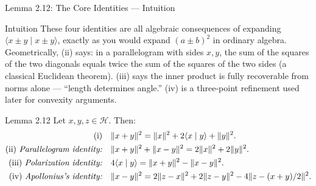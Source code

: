\documentclass[aspectratio=169,10pt]{beamer}
\newcommand{\Hil}{\mathcal{H}}
\newcommand{\ip}[2]{\langle #1 \mid #2 \rangle}
\begin{document}
\begin{frame}{Lemma 2.12: The Core Identities --- Intuition}
  \begin{block}{Intuition}
    These four identities are all algebraic consequences of expanding
    $\ip{x\pm y}{x\pm y}$, exactly as you would expand $(a\pm b)^2$ in
    ordinary algebra. Geometrically, (ii) says: in a parallelogram with
    sides $x,y$, the sum of the squares of the two diagonals equals twice
    the sum of the squares of the two sides (a classical Euclidean
    theorem). (iii) says the inner product is fully recoverable from norms
    alone --- ``length determines angle.'' (iv) is a three-point refinement
    used later for convexity arguments.
  \end{block}

  \begin{block}{Lemma 2.12}
    Let $x,y,z \in \Hil$. Then:
    \begin{align*}
      \text{(i)}\quad & \|x+y\|^2 = \|x\|^2 + 2\ip{x}{y} + \|y\|^2. \\
      \text{(ii) \emph{Parallelogram identity:}}\quad
        & \|x+y\|^2 + \|x-y\|^2 = 2\|x\|^2 + 2\|y\|^2. \\
      \text{(iii) \emph{Polarization identity:}}\quad
        & 4\ip{x}{y} = \|x+y\|^2 - \|x-y\|^2. \\
      \text{(iv) \emph{Apollonius's identity:}}\quad
        & \|x-y\|^2 = 2\|z-x\|^2 + 2\|z-y\|^2 - 4\|z-(x+y)/2\|^2.
    \end{align*}
  \end{block}
\end{frame}
\end{document}
